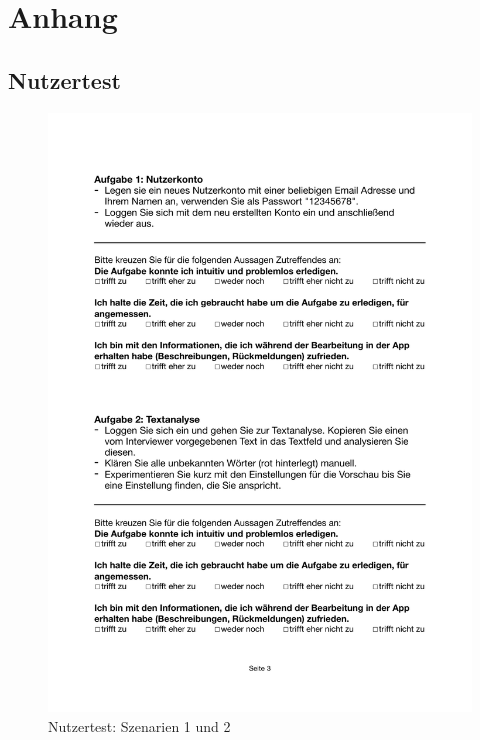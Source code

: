 
\chapter{Anhang}

\section*{Nutzertest}

\begin{figure}
	\centering
	\includegraphics[width=.95\linewidth, frame]{figures/evaluation/test12}
	\caption{Nutzertest: Szenarien 1 und 2}
	\label{fig:evaluation-test12}
\end{figure}
\newpage

